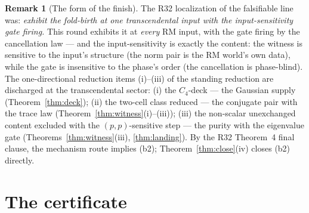 \documentclass[11pt]{article}
\theoremstyle{definition}
\newtheorem{remark}[theorem]{Remark}
\begin{document}
\begin{remark}[The form of the finish]
The R32 localization of the falsifiable line was: \emph{exhibit the
fold-birth at one transcendental input with the input-sensitivity gate
firing.} This round exhibits it at \emph{every} RM input, with the gate
firing by the cancellation law --- and the input-sensitivity is exactly
the content: the witness is sensitive to the input's structure (the
norm pair is the RM world's own data), while the gate is insensitive to
the phase's order (the cancellation is phase-blind). The one-directional
reduction items (i)--(iii) of the standing reduction are discharged at
the transcendental sector: (i) the $C_4$-deck --- the Gaussian supply
(Theorem~\ref{thm:deck}); (ii) the two-cell class reduced --- the
conjugate pair with the trace law
(Theorem~\ref{thm:witness}(i)--(iii)); (iii) the non-scalar
unexchanged content excluded with the $(p,p)$-sensitive step --- the
purity with the eigenvalue gate (Theorems~\ref{thm:witness}(iii),
\ref{thm:landing}). By the R32 Theorem~4 final clause, the mechanism
route implies (b2); Theorem~\ref{thm:close}(iv) closes (b2) directly.
\end{remark}

\section{The certificate}
\end{document}
